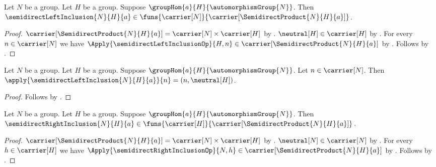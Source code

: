 \begin{proposition}\label{semidirect_left_inclusion_type}
    Let $N$ be a group.
    Let $H$ be a group.
    Suppose $\groupHom{a}{H}{\automorphismGroup{N}}$.
    Then $\semidirectLeftInclusion{N}{H}{a}\in
        \funs{\carrier[N]}{\carrier[\SemidirectProduct{N}{H}{a}]}$.
\end{proposition}
\begin{proof}
    $\carrier[\SemidirectProduct{N}{H}{a}]=
        \carrier[N]\times\carrier[H]$ by
        .
    $\neutral[H]\in\carrier[H]$ by
        .
    For every $n\in\carrier[N]$ we have
        $\Apply{\semidirectLeftInclusionOp}{H,n}\in
            \carrier[\SemidirectProduct{N}{H}{a}]$ by
        .
    Follows by
        .
\end{proof}

\begin{proposition}\label{semidirect_left_inclusion_apply}
    Let $N$ be a group.
    Let $H$ be a group.
    Suppose $\groupHom{a}{H}{\automorphismGroup{N}}$.
    Let $n\in\carrier[N]$.
    Then $\apply{\semidirectLeftInclusion{N}{H}{a}}{n}=
        (n,\neutral[H])$.
\end{proposition}
\begin{proof}
    Follows by
        .
\end{proof}

\begin{proposition}\label{semidirect_right_inclusion_type}
    Let $N$ be a group.
    Let $H$ be a group.
    Suppose $\groupHom{a}{H}{\automorphismGroup{N}}$.
    Then $\semidirectRightInclusion{N}{H}{a}\in
        \funs{\carrier[H]}{\carrier[\SemidirectProduct{N}{H}{a}]}$.
\end{proposition}
\begin{proof}
    $\carrier[\SemidirectProduct{N}{H}{a}]=
        \carrier[N]\times\carrier[H]$ by
        .
    $\neutral[N]\in\carrier[N]$ by
        .
    For every $h\in\carrier[H]$ we have
        $\Apply{\semidirectRightInclusionOp}{N,h}\in
            \carrier[\SemidirectProduct{N}{H}{a}]$ by
        .
    Follows by
        .
\end{proof}

